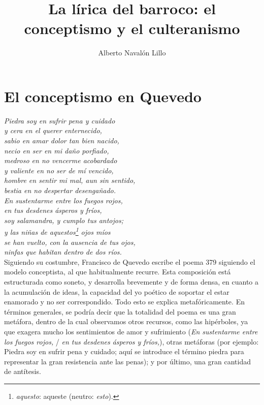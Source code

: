 \documentclass[12pt,a4paper]{article}
\title{\textbf{La lírica del barroco: el conceptismo y el culteranismo}}
\author{Alberto Navalón Lillo}
\begin{document}
\maketitle
\tableofcontents

\section{El conceptismo en Quevedo}


\indent\textit{Piedra soy en sufrir pena y cuidado}\\
\indent\textit{y cera en el querer enternecido,}\\
\indent\textit{sabio en amar dolor tan bien nacido,}\\
\indent\textit{necio en ser en mi daño porfiado,}\\

\indent\textit{medroso en no vencerme acobardado}\\
\indent\textit{y valiente en no ser de mí vencido,}\\
\indent\textit{hombre en sentir mi mal, aun sin sentido,}\\
\indent\textit{bestia en no despertar desengañado.}\\

\indent\textit{En sustentarme entre los fuegos rojos,}\\
\indent\textit{en tus desdenes ásperos y fríos,}\\
\indent\textit{soy salamandra, y cumplo tus antojos;}\\

\indent\textit{y las niñas de aquestos\footnote{\textit{aquesto}: aqueste (neutro: \textit{esto}).} ojos míos}\\
\indent\textit{se han vuelto, con la ausencia de tus ojos,}\\
\indent\textit{ninfas que habitan dentro de dos ríos.}\\

Siguiendo su costumbre, Francisco de Quevedo escribe el poema 379 siguiendo el modelo conceptista, al que habitualmente recurre. Esta composición está estructurada como soneto, y desarrolla brevemente y de forma densa, en cuanto a la acumulación de ideas, la capacidad del yo poético de soportar el estar enamorado y no ser correspondido. Todo esto se explica metafóricamente. En términos generales, se podría decir que la totalidad del poema es una gran metáfora, dentro de la cual observamos otros recursos, como las hipérboles, ya que exagera mucho los sentimientos de amor y sufrimiento (\textit{En sustentarme entre los fuegos rojos,} / \textit{en tus desdenes ásperos y fríos,}), otras metáforas (por ejemplo: Piedra soy en sufrir pena y cuidado; aquí se introduce el término piedra para representar la gran resistencia ante las penas); y por último, una gran cantidad de antítesis.\\
\end{document}
